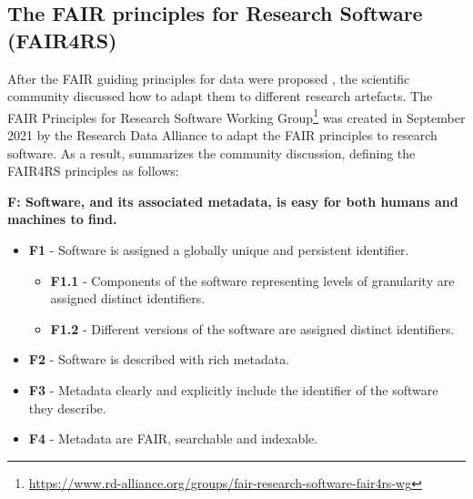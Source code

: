 
\subsection{The FAIR principles for Research Software (FAIR4RS)}\label{subsec:fair4rs}


After the FAIR guiding principles for data were proposed \cite{wilkinson_fair_2016}, the scientific community discussed how to adapt them to different research artefacts. The FAIR Principles for Research Software Working Group\footnote{\url{https://www.rd-alliance.org/groups/fair-research-software-fair4rs-wg}} was created in September 2021 by the Research Data Alliance to adapt the FAIR principles to research software. As a result, \cite{chue_hong_neil_p_2022_6623556} summarizes the community discussion, defining the FAIR4RS principles as follows:


\textbf{F: Software, and its associated metadata, is easy for both humans and machines to find.}

\begin{itemize}
    \item \textbf{F1} - Software is assigned a globally unique and persistent identifier.
    \begin{itemize}
        \item \textbf{F1.1} - Components of the software representing levels of granularity are assigned distinct identifiers.
        \item \textbf{F1.2} - Different versions of the software are assigned distinct identifiers.
    \end{itemize}

    \item \textbf{F2} - Software is described with rich metadata.
    \item \textbf{F3} - Metadata clearly and explicitly include the identifier of the software they describe.
    \item \textbf{F4} - Metadata are FAIR, searchable and indexable.
\end{itemize}

